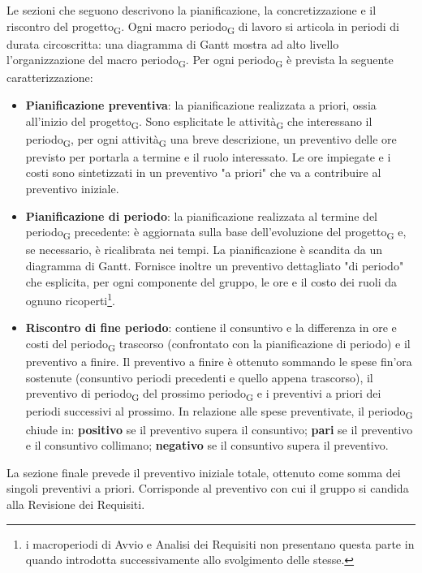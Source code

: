 Le sezioni che seguono descrivono la pianificazione, la concretizzazione e il riscontro del progetto\textsubscript{G}. Ogni macro periodo\textsubscript{G} di lavoro si articola in periodi di durata circoscritta: una diagramma di Gantt mostra ad alto livello l'organizzazione del macro periodo\textsubscript{G}. Per ogni periodo\textsubscript{G} è prevista la seguente caratterizzazione:
\begin{itemize}
	\item \textbf{Pianificazione preventiva}: la pianificazione realizzata a priori, ossia all'inizio del progetto\textsubscript{G}. Sono esplicitate le attività\textsubscript{G} che interessano il periodo\textsubscript{G}, per ogni attività\textsubscript{G} una breve descrizione, un preventivo delle ore previsto per portarla a termine e il ruolo interessato. Le ore impiegate e i costi sono sintetizzati in un preventivo "a priori" che va a contribuire al preventivo iniziale.
	
	\item \textbf{Pianificazione di periodo}: la pianificazione realizzata al termine del periodo\textsubscript{G} precedente: è aggiornata sulla base dell'evoluzione del progetto\textsubscript{G} e, se necessario, è ricalibrata nei tempi. La pianificazione è scandita da un diagramma di Gantt. Fornisce inoltre un preventivo dettagliato "di periodo" che esplicita, per ogni componente del gruppo, le ore e il costo dei ruoli da ognuno ricoperti\footnote{i macroperiodi di Avvio e Analisi dei Requisiti non presentano questa parte in quando introdotta successivamente allo svolgimento delle stesse.}.
	
	\item \textbf{Riscontro di fine periodo}: contiene il consuntivo e la differenza in ore e costi del periodo\textsubscript{G} trascorso (confrontato con la pianificazione di periodo) e il preventivo a finire. Il preventivo a finire è ottenuto sommando le spese fin'ora sostenute (consuntivo periodi precedenti e quello appena trascorso), il preventivo di periodo\textsubscript{G} del prossimo periodo\textsubscript{G} e i preventivi a priori dei periodi successivi al prossimo. In relazione alle spese preventivate, il periodo\textsubscript{G} chiude in: \textbf{positivo} se il preventivo supera il consuntivo; \textbf{pari} se il preventivo e il consuntivo collimano; \textbf{negativo} se il consuntivo supera il preventivo.
	
\end{itemize}

La sezione finale prevede il preventivo iniziale totale, ottenuto come somma dei singoli preventivi a priori. Corrisponde al preventivo con cui il gruppo si candida alla Revisione dei Requisiti.

